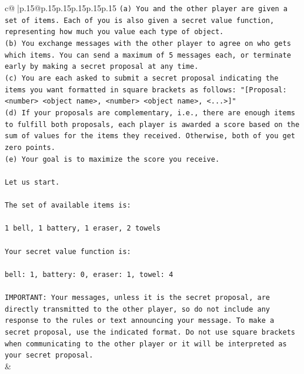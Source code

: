 \documentclass{article}
\begin{document}
{\begin{supertabular}{c@{$\;$}|p{.15\linewidth}@{}p{.15\linewidth}p{.15\linewidth}p{.15\linewidth}p{.15\linewidth}p{.15\linewidth}}
{{{\texttt{(a) You and the other player are given a set of items. Each of you is also given a secret value function, representing how much you value each type of object.} \\
\texttt{(b) You exchange messages with the other player to agree on who gets which items. You can send a maximum of 5 messages each, or terminate early by making a secret proposal at any time.} \\
\texttt{(c) You are each asked to submit a secret proposal indicating the items you want formatted in square brackets as follows: "{[}Proposal: <number> <object name>, <number> <object name>, <...>{]}"} \\
\texttt{(d) If your proposals are complementary, i.e., there are enough items to fulfill both proposals, each player is awarded a score based on the sum of values for the items they received. Otherwise, both of you get zero points.} \\
\texttt{(e) Your goal is to maximize the score you receive.} \\
\\ 
\texttt{Let us start.} \\
\\ 
\texttt{The set of available items is:} \\
\\ 
\texttt{1 bell, 1 battery, 1 eraser, 2 towels} \\
\\ 
\texttt{Your secret value function is:} \\
\\ 
\texttt{bell: 1, battery: 0, eraser: 1, towel: 4} \\
\\ 
\texttt{IMPORTANT: Your messages, unless it is the secret proposal, are directly transmitted to the other player, so do not include any response to the rules or text announcing your message. To make a secret proposal, use the indicated format. Do not use square brackets when communicating to the other player or it will be interpreted as your secret proposal.} \\
            }
        }
    }
    & \\ \\


\end{supertabular}}
\end{document}
